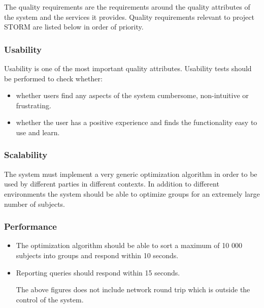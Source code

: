 The quality requirements are the requirements around the quality attributes of the system and
the services it provides. Quality requirements relevant to project STORM are listed below in order of priority. \par

\subsubsection{Usability}
Usability is one of the most important quality attributes. Usability tests should be performed to check whether:
\begin{itemize}
\item whether users find any aspects of the system cumbersome, non-intuitive or frustrating.
\item whether the user has a positive experience and finds the functionality easy to use and learn.
\end{itemize}

\subsubsection{Scalability}
The system must implement a very generic optimization algorithm in order to be used by different parties in different contexts. In addition to different environments the system should be able to optimize groups for an extremely large number of subjects.

\subsubsection{Performance}
\begin{itemize}
\item The optimization algorithm should be able to sort a maximum of 10 000 subjects into groups and respond within 10 seconds.
\item Reporting queries should respond within 15 seconds. \par
The above figures does not include network round trip which is outside the control of the system.
\end{itemize}

